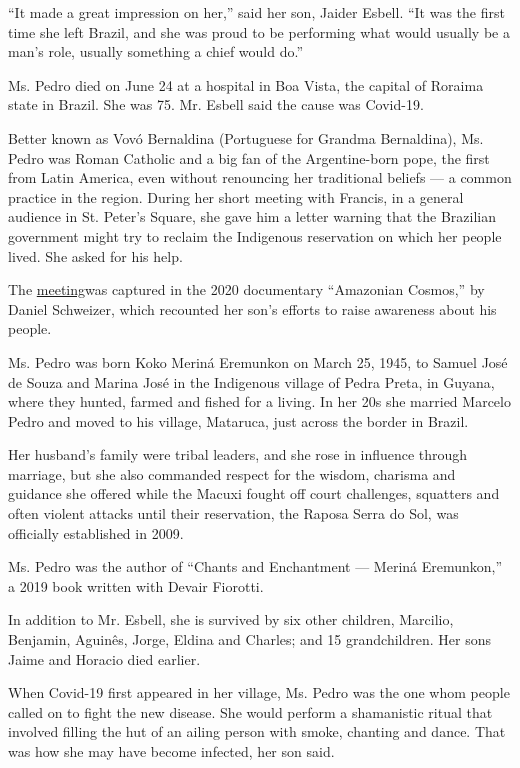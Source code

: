 ``It made a great impression on her,'' said her son, Jaider Esbell. ``It
was the first time she left Brazil, and she was proud to be performing
what would usually be a man's role, usually something a chief would
do.''

Ms. Pedro died on June 24 at a hospital in Boa Vista, the capital of
Roraima state in Brazil. She was 75. Mr. Esbell said the cause was
Covid-19.

Better known as Vovó Bernaldina (Portuguese for Grandma Bernaldina), Ms.
Pedro was Roman Catholic and a big fan of the Argentine-born pope, the
first from Latin America, even without renouncing her traditional
beliefs --- a common practice in the region. During her short meeting
with Francis, in a general audience in St. Peter's Square, she gave him
a letter warning that the Brazilian government might try to reclaim the
Indigenous reservation on which her people lived. She asked for his
help.

The
\href{https://www.ecoamazonia.org.br/2018/11/indigenas-macuxi-recebidos-papa-francisco/}{meeting}was
captured in the 2020 documentary ``Amazonian Cosmos,'' by Daniel
Schweizer, which recounted her son's efforts to raise awareness about
his people.

Ms. Pedro was born Koko Meriná Eremunkon on March 25, 1945, to Samuel
José de Souza and Marina José in the Indigenous village of Pedra Preta,
in Guyana, where they hunted, farmed and fished for a living. In her 20s
she married Marcelo Pedro and moved to his village, Mataruca, just
across the border in Brazil.

Her husband's family were tribal leaders, and she rose in influence
through marriage, but she also commanded respect for the wisdom,
charisma and guidance she offered while the Macuxi fought off court
challenges, squatters and often violent attacks until their reservation,
the Raposa Serra do Sol, was officially established in 2009.

Ms. Pedro was the author of ``Chants and Enchantment --- Meriná
Eremunkon,'' a 2019 book written with Devair Fiorotti.

In addition to Mr. Esbell, she is survived by six other children,
Marcilio, Benjamin, Aguinês, Jorge, Eldina and Charles; and 15
grandchildren. Her sons Jaime and Horacio died earlier.

When Covid-19 first appeared in her village, Ms. Pedro was the one whom
people called on to fight the new disease. She would perform a
shamanistic ritual that involved filling the hut of an ailing person
with smoke, chanting and dance. That was how she may have become
infected, her son said.

